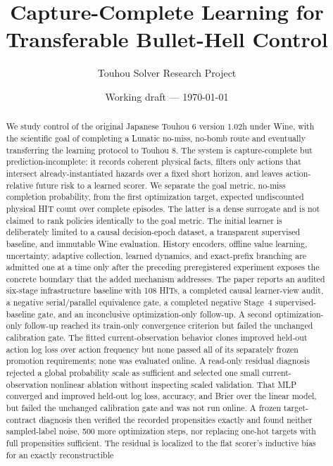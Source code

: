 \documentclass[11pt]{article}
\title{Capture-Complete Learning for Transferable Bullet-Hell Control}
\author{Touhou Solver Research Project}
\date{Working draft --- \today}
\begin{document}
\maketitle

\begin{abstract}
We study control of the original Japanese Touhou 6 version 1.02h under Wine,
with the scientific goal of completing a Lunatic no-miss, no-bomb route and
eventually transferring the learning protocol to Touhou 8.  The system is
capture-complete but prediction-incomplete: it records coherent physical facts,
filters only actions that intersect already-instantiated hazards over a fixed
short horizon, and leaves action-relative future risk to a learned scorer.  We
separate the goal metric, no-miss completion probability, from the first
optimization target, expected undiscounted physical HIT count over complete
episodes.
The latter is a dense surrogate and is not claimed to rank policies identically
to the goal metric.  The initial learner is deliberately limited to a causal
decision-epoch dataset, a transparent supervised baseline, and immutable Wine
evaluation.  History encoders, offline value learning, uncertainty, adaptive
collection, learned dynamics, and exact-prefix branching are admitted one at a
time only after the preceding preregistered experiment exposes the concrete
boundary that the added mechanism addresses.
The paper reports an audited six-stage infrastructure baseline with 108 HITs,
a completed causal learner-view audit, a negative serial/parallel equivalence
gate, a completed negative Stage~4 supervised-baseline gate, and an
inconclusive optimization-only follow-up.  A second optimization-only
follow-up reached its train-only convergence criterion but failed the unchanged
calibration gate.  The fitted current-observation
behavior clones improved held-out action log loss over action frequency but
none passed all of its separately frozen promotion requirements; none was
evaluated online.  A read-only residual diagnosis rejected a global
probability scale as sufficient and selected one small current-observation
nonlinear ablation without inspecting scaled validation.  That MLP converged
and improved held-out log loss, accuracy, and Brier over the linear model, but
failed the unchanged calibration gate and was not run online.  A frozen
target-contract diagnosis then verified the recorded propensities exactly and
found neither sampled-label noise, 500 more optimization steps, nor replacing
one-hot targets with full propensities sufficient.  The residual is localized
to the flat scorer's inductive bias for an exactly reconstructible

\end{abstract}
\end{document}
